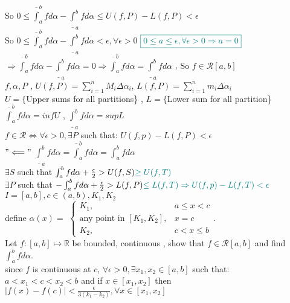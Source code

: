 \documentclass[12pt]{amsbook}
\begin{document}
\begin{tcolorbox}[colback=brown!5!white,colframe=brown!60!black]
So $0\leq \overline{\int}_a^b f d\alpha-\underline{\int}_a^b fd\alpha\leq U(f,P)-L(f,P)<\epsilon$\\
So $0\leq\overline{\int}_a^b fd\alpha-\underline{\int}_a^b fd\alpha<\epsilon,\forall\epsilon>0$
${\color{teal}\boxed{0\leq a\leq \epsilon,\forall\epsilon>0\Rightarrow a=0}}$\\
$\Rightarrow\overline{\int}_a^b fd\alpha-\underline{\int}_a^b f d\alpha=0\Rightarrow \overline{\int}_a^b f 
d\alpha=\underline{\int}_a^b f d\alpha$ , {So $f\in\mathscr{R}[a,b]$}\\
\noindent{\color{teal} \rule{\linewidth}{0.4mm} }
$f,\alpha,P$ , $U(f,P)=\sum_{i=1}^n M_i\Delta\alpha_i$, $L(f,P)=\sum_{i=1}^n m_i\Delta\alpha_i$\\
$U=\{$Upper sums for all  partitions\} , $L=\{$Lower sum for all  partition\}\\
$\overline{\int}_a^b fd\alpha=infU$ , $\underline{\int}_a^b f d\alpha=sup L$\\
$f\in\mathscr{R}\iff\forall\epsilon>0,\exists P$ such that: $U(f,p)-L(f,P)<\epsilon$\\
{\color{teal}$"\Longleftarrow"$} $\underline{\int}_a^b f d\alpha=\overline{\int}_a^b fd\alpha=\int_a^b f d\alpha$\\
$\exists S$ such that $\int_a^b f d\alpha +\frac{\epsilon}{2}>U(f,S){\color{teal}\geq U(f,T)}$\\
$\exists P$ such that $-\int_a^b fd\alpha+\frac{\epsilon}{2}>L(f,P){\color{teal}\leq L(f,T)\Rightarrow U(f,p)-L(f,T)<\epsilon}$
\noindent{\color{teal} \rule{\linewidth}{0.4mm} }
{} $I=[a,b],c\in(a,b), K_1,K_2$\\
define $\alpha(x)=$
$\begin{cases}
K_1,& a\leq x<c\\
\text{any point in } [K_1,K_2],& x=c\\
K_2,& c<x\leq b
\end{cases}$.\\
Let $f:[a,b]\mapsto\mathbb{R}$ be bounded, continuous , show that $f\in\mathscr{R}[a,b]$ and find $\int_a^b fd\alpha$.\\
{} since $f$ is continuous at $c$, $\forall\epsilon>0,\exists x_1,x_2\in [a,b]$ such that:\\
$a<x_1<c<x_2<b$ and if $x\in[x_1,x_2]$ then $|f(x)-f(c)|<\frac{\epsilon}{3(k_1-k_2)},\forall x\in[x_1,x_2]$

\end{tcolorbox}
\end{document}
